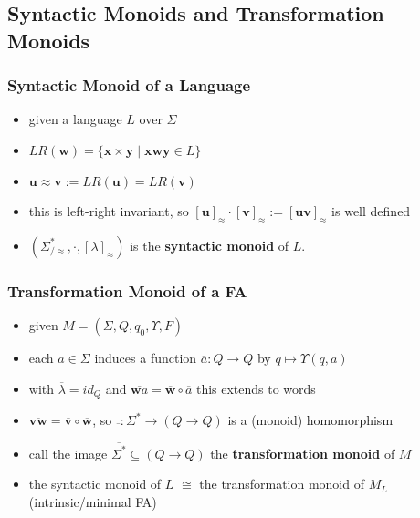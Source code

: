 \documentclass{beamer}
\begin{document}

\subsection{Syntactic Monoids and Transformation Monoids}
\begin{frame}
\frametitle{Syntactic Monoid of a Language}
\begin{itemize}
  \item given a language $L$ over $\Sigma$
  \item $LR(\mathbf{w}) = \{\mathbf{x} \times \mathbf{y} \mid \mathbf{xwy} \in L\}$
  \item $\mathbf{u} \approx \mathbf{v} := LR(\mathbf{u}) = LR(\mathbf{v})$
  \item this is left-right invariant, so $[\mathbf{u}]_\approx
    \cdot [\mathbf{v}]_\approx := [\mathbf{uv}]_\approx$ is well defined
  \item $(\Sigma^*_{/ \approx}, \cdot, [\lambda]_\approx)$ is the
    \textbf{syntactic monoid} of $L$.
\end{itemize}
\end{frame}


\begin{frame}
\frametitle{Transformation Monoid of a FA}
\begin{itemize}
\item given $M = (\Sigma, Q, q_0, \Upsilon, F)$
\item each $a \in \Sigma$ induces a function $\overline{a} : Q \rightarrow Q$
    by $q \mapsto \Upsilon(q, a)$
\item with $\overline{\lambda} = id_{Q}$ and $\overline{\mathbf{w}a} =
        \overline{\mathbf{w}} \circ \overline{a}$ this extends to words
\item $\overline{\mathbf{vw}} = \overline{\mathbf{v}} \circ
  \overline{\mathbf{w}}$, so $\overline{} : \Sigma^* \rightarrow (Q \rightarrow
  Q)$ is a (monoid) homomorphism
\item call the image $\overline{\Sigma^*} \subseteq (Q \rightarrow Q)$ the
  \textbf{transformation monoid} of $M$
\item the syntactic monoid of $L$ $\cong$ the transformation monoid of $M_L$
  (intrinsic/minimal FA)
\end{itemize}
\end{frame}
\end{document}
